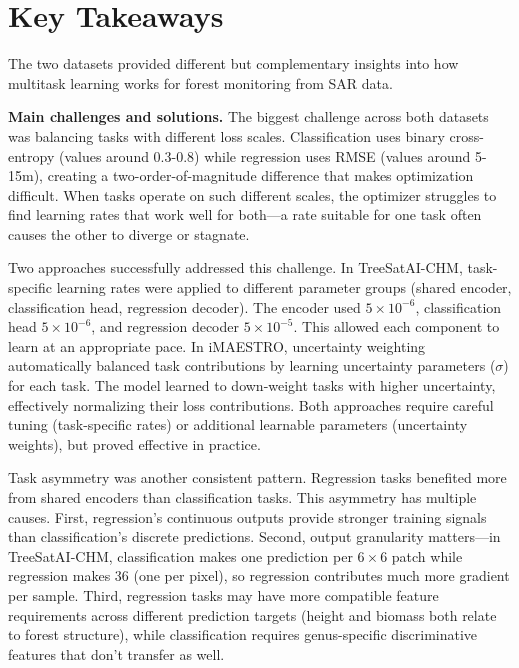 \section{Key Takeaways}

The two datasets provided different but complementary insights into how multitask learning works for forest monitoring from SAR data.

\textbf{Main challenges and solutions.} The biggest challenge across both datasets was balancing tasks with different loss scales. Classification uses binary cross-entropy (values around 0.3-0.8) while regression uses RMSE (values around 5-15m), creating a two-order-of-magnitude difference that makes optimization difficult. When tasks operate on such different scales, the optimizer struggles to find learning rates that work well for both---a rate suitable for one task often causes the other to diverge or stagnate.

Two approaches successfully addressed this challenge. In TreeSatAI-CHM, task-specific learning rates were applied to different parameter groups (shared encoder, classification head, regression decoder). The encoder used $5\times 10^{-6}$, classification head $5\times 10^{-6}$, and regression decoder $5\times 10^{-5}$. This allowed each component to learn at an appropriate pace. In iMAESTRO, uncertainty weighting automatically balanced task contributions by learning uncertainty parameters ($\sigma$) for each task. The model learned to down-weight tasks with higher uncertainty, effectively normalizing their loss contributions. Both approaches require careful tuning (task-specific rates) or additional learnable parameters (uncertainty weights), but proved effective in practice.

Task asymmetry was another consistent pattern. Regression tasks benefited more from shared encoders than classification tasks. This asymmetry has multiple causes. First, regression's continuous outputs provide stronger training signals than classification's discrete predictions. Second, output granularity matters---in TreeSatAI-CHM, classification makes one prediction per $6\times 6$ patch while regression makes 36 (one per pixel), so regression contributes much more gradient per sample. Third, regression tasks may have more compatible feature requirements across different prediction targets (height and biomass both relate to forest structure), while classification requires genus-specific discriminative features that don't transfer as well.

